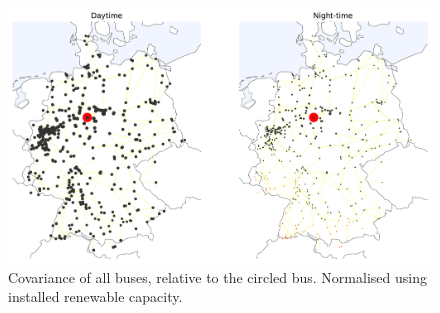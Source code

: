 \documentclass[main.tex]{subfiles}
\begin{document}
\begin{figure}[ht]
    \centering
    \includegraphics[width=\textwidth]{img/bus_correlation_123_fullcov_day_and_night.pdf}
    \caption{
    \label{fig:buscov}Covariance of all buses, relative to the circled bus. Normalised using installed renewable capacity.}
\end{figure}
\end{document}

